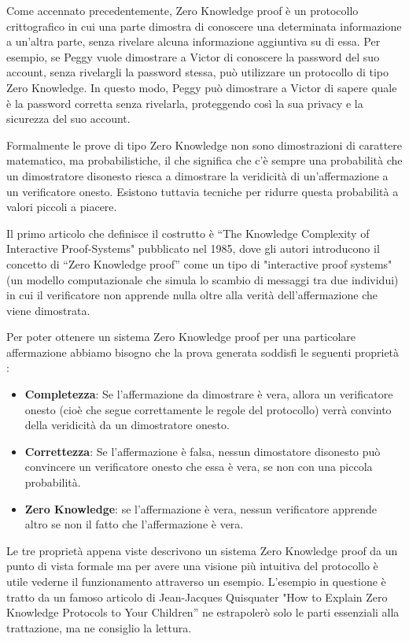 Come accennato precedentemente, Zero Knowledge proof è un protocollo crittografico in cui una parte dimostra di
conoscere una determinata informazione a un'altra parte, senza rivelare alcuna informazione aggiuntiva su di essa. Per
esempio, se Peggy vuole dimostrare a Victor di conoscere la password del suo account, senza rivelargli la password stessa,
può utilizzare un protocollo di tipo Zero Knowledge. In questo modo, Peggy può dimostrare a Victor di sapere quale è la
password corretta senza rivelarla, proteggendo così la sua privacy e la sicurezza del suo account.

Formalmente le prove di tipo Zero Knowledge non sono dimostrazioni di carattere matematico, ma probabilistiche, il che
significa che c'è sempre una probabilità che un dimostratore disonesto riesca a dimostrare la veridicità di
un'affermazione a un verificatore onesto. Esistono tuttavia tecniche per ridurre questa probabilità a valori piccoli a
piacere.

Il primo articolo che definisce il costrutto è “The Knowledge Complexity of Interactive Proof-Systems"\cite{10.1145/22145.22178} pubblicato nel
1985, dove  gli autori introducono il concetto di “Zero Knowledge proof” come un tipo di "interactive proof
systems" \cite{interactive_proof_system} (un modello computazionale che simula lo scambio di
messaggi tra due individui) in cui il verificatore non apprende nulla oltre alla verità dell'affermazione che viene
dimostrata.

Per poter ottenere un sistema Zero Knowledge proof per una particolare affermazione abbiamo bisogno che la prova
generata soddisfi le seguenti proprietà :
\begin{itemize}
    \item \textbf{Completezza}: Se l'affermazione da dimostrare è vera, allora un verificatore onesto (cioè che segue correttamente le
    regole del protocollo) verrà convinto della veridicità da un dimostratore onesto.
    \item \textbf{Correttezza}: Se l'affermazione è falsa, nessun dimostatore disonesto può convincere un verificatore onesto che essa è vera, se non con una piccola
    probabilità.
    \item \textbf{Zero Knowledge}: se l'affermazione è vera, nessun verificatore apprende altro se non il fatto che
    l'affermazione è vera.
\end{itemize}
Le tre proprietà appena viste descrivono un sistema Zero Knowledge proof da un punto di vista formale ma per avere una visione più
intuitiva del protocollo è utile vederne il funzionamento attraverso un esempio. L’esempio in questione è tratto
da un famoso articolo di Jean-Jacques Quisquater "How to Explain Zero Knowledge Protocols to Your Children” \cite{10.1007/0-387-34805-0_60}  ne
estrapolerò solo le parti essenziali alla trattazione, ma ne consiglio la lettura.

